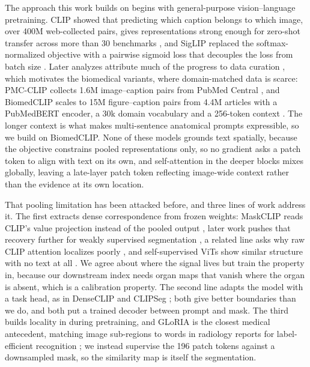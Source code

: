\documentclass[10pt]{article}
\begin{document}
The approach this work builds on begins with general-purpose vision--language
pretraining. CLIP showed that predicting which caption belongs to which image, over 400M
web-collected pairs, gives representations strong enough for zero-shot transfer
across more than 30 benchmarks \cite{radford2021clip}, and SigLIP replaced the
softmax-normalized objective with a pairwise sigmoid loss that decouples the loss
from batch size \cite{zhai2023siglip}. Later analyzes attribute much of the
progress to data curation \cite{xu2024metaclip, gadre2023datacomp}, which
motivates the biomedical variants, where domain-matched data is scarce: PMC-CLIP
collects 1.6M image--caption pairs from PubMed Central \cite{lin2023pmcclip}, and
BiomedCLIP scales to 15M figure--caption pairs from 4.4M articles with a
PubMedBERT encoder, a 30k domain vocabulary and a 256-token context
\cite{zhang2025biomedclip}. The longer context is what makes multi-sentence
anatomical prompts expressible, so we build on BiomedCLIP. None of these models
grounds text spatially, because the objective constrains pooled representations
only, so no gradient asks a patch token to align with text on its own, and
self-attention in the deeper blocks mixes globally, leaving a late-layer patch
token reflecting image-wide context rather than the evidence at its own location.

That pooling limitation has been attacked before, and three lines of work address
it. The first extracts dense correspondence from
frozen weights: MaskCLIP reads CLIP's value projection instead of the pooled
output \cite{zhou2022maskclip}, later work pushes that recovery further for weakly
supervised segmentation \cite{yang2025clipdense}, a related line asks why raw CLIP
attention localizes poorly \cite{li2024clipexplain}, and self-supervised ViTs show
similar structure with no text at all \cite{caron2021dino}. We agree about where
the signal lives but train the property in, because our downstream index needs
organ maps that vanish where the organ is absent, which is a calibration property.
The second line adapts the model with a task head, as in DenseCLIP
\cite{rao2022denseclip} and CLIPSeg \cite{lueddecke2022clipseg}; both give better
boundaries than we do, and both put a trained decoder between prompt and mask. The
third builds locality in during pretraining, and GLoRIA is the closest medical
antecedent, matching image sub-regions to words in radiology reports for
label-efficient recognition \cite{huang2021gloria}; we instead supervise the 196
patch tokens against a downsampled mask, so the similarity map is itself the
segmentation.
\end{document}
